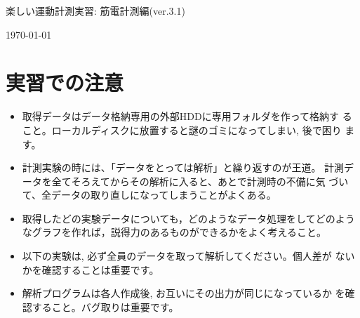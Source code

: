 \documentclass{jsarticle}
\def\version{3.1}
\begin{document}
\begin{center}
  {\LARGE 楽しい運動計測実習: 筋電計測編(ver.\version)}
\end{center}
\begin{flushright}
\today
\end{flushright}

\section*{実習での注意}
\begin{itemize}
\item 取得データはデータ格納専用の外部HDDに専用フォルダを作って格納す
  ること。ローカルディスクに放置すると謎のゴミになってしまい, 後で困り
  ます。
\item 計測実験の時には、「データをとっては解析」と繰り返すのが王道。
  計測データを全てそろえてからその解析に入ると、あとで計測時の不備に気
  づいて、全データの取り直しになってしまうことがよくある。
\item 取得したどの実験データについても，どのようなデータ処理をしてどのようなグラフを作れば，説得力のあるものができるかをよく考えること。
\item 以下の実験は, 必ず全員のデータを取って解析してください。個人差が
  ないかを確認することは重要です。
\item 解析プログラムは各人作成後, お互いにその出力が同じになっているか
  を確認すること。バグ取りは重要です。
\end{itemize}

\end{document}
